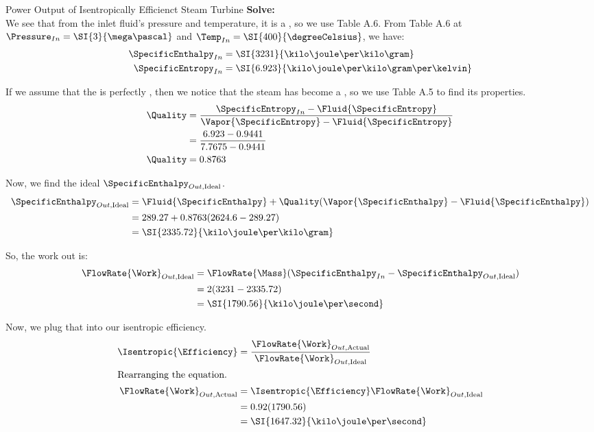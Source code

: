 \begin{example}{Power Output of Isentropically Efficienct Steam Turbine}
  \textbf{Solve:} \\
  We see that from the inlet fluid's pressure and temperature, it is a , so we use Table A.6.
  From Table A.6 at $\Pressure_{In} = \SI{3}{\mega\pascal}$ and $\Temp_{In} = \SI{400}{\degreeCelsius}$, we have:
  \begin{align*}
    \SpecificEnthalpy_{In} &= \SI{3231}{\kilo\joule\per\kilo\gram} \\
    \SpecificEntropy_{In} &= \SI{6.923}{\kilo\joule\per\kilo\gram\per\kelvin}
  \end{align*}

  If we assume that the  is perfectly , then we notice that the steam has become a , so we use Table A.5 to find its properties.
  \begin{align*}
    \Quality &= \frac{\SpecificEntropy_{In} - \Fluid{\SpecificEntropy}}{\Vapor{\SpecificEntropy} - \Fluid{\SpecificEntropy}} \\
             &= \frac{6.923 - 0.9441}{7.7675 - 0.9441} \\
    \Quality &= 0.8763
  \end{align*}

  Now, we find the ideal $\SpecificEnthalpy_{Out, \text{Ideal}}$.
  \begin{align*}
    \SpecificEnthalpy_{Out, \text{Ideal}} &= \Fluid{\SpecificEnthalpy} + \Quality (\Vapor{\SpecificEnthalpy} - \Fluid{\SpecificEnthalpy}) \\
                                          &= 289.27 + 0.8763 (2624.6 - 289.27) \\
                                          &= \SI{2335.72}{\kilo\joule\per\kilo\gram}
  \end{align*}

  So, the  work out is:
  \begin{align*}
    \FlowRate{\Work}_{Out, \text{Ideal}} &= \FlowRate{\Mass} (\SpecificEnthalpy_{In} - \SpecificEnthalpy_{Out, \text{Ideal}}) \\
                                         &= 2 (3231 - 2335.72) \\
                                         &= \SI{1790.56}{\kilo\joule\per\second}
  \end{align*}

  Now, we plug that into our isentropic efficiency.
  \begin{align*}
    \Isentropic{\Efficiency} &= \frac{\FlowRate{\Work}_{Out, \text{Actual}}}{\FlowRate{\Work}_{Out, \text{Ideal}}} \\
    \shortintertext{Rearranging the equation.}
    \FlowRate{\Work}_{Out, \text{Actual}} &= \Isentropic{\Efficiency} \FlowRate{\Work}_{Out, \text{Ideal}} \\
                             &= 0.92 (1790.56) \\
                             &= \SI{1647.32}{\kilo\joule\per\second}
  \end{align*}


\end{example}
